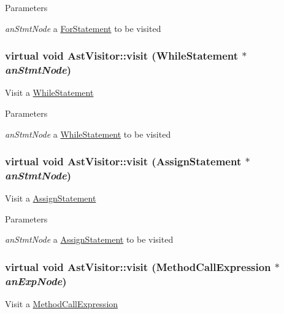 \begin{DoxyParams}{Parameters}
\item[{\em anStmtNode}]a \hyperlink{classForStatement}{ForStatement} to be visited \end{DoxyParams}
\hypertarget{classAstVisitor_ac1272bbe5b7c9b604cfd112001cbafa8}{
\subsubsection[{visit}]{\setlength{\rightskip}{0pt plus 5cm}virtual void AstVisitor::visit ({\bf WhileStatement} $\ast$ {\em anStmtNode})}}
\label{classAstVisitor_ac1272bbe5b7c9b604cfd112001cbafa8}
Visit a \hyperlink{classWhileStatement}{WhileStatement}


\begin{DoxyParams}{Parameters}
\item[{\em anStmtNode}]a \hyperlink{classWhileStatement}{WhileStatement} to be visited \end{DoxyParams}
\hypertarget{classAstVisitor_a44bb2ee3b317cd859760b2a747a26dfd}{
\subsubsection[{visit}]{\setlength{\rightskip}{0pt plus 5cm}virtual void AstVisitor::visit ({\bf AssignStatement} $\ast$ {\em anStmtNode})}}
\label{classAstVisitor_a44bb2ee3b317cd859760b2a747a26dfd}
Visit a \hyperlink{classAssignStatement}{AssignStatement}


\begin{DoxyParams}{Parameters}
\item[{\em anStmtNode}]a \hyperlink{classAssignStatement}{AssignStatement} to be visited \end{DoxyParams}
\hypertarget{classAstVisitor_af1b565438e63e492a6696a7ee0872815}{
\subsubsection[{visit}]{\setlength{\rightskip}{0pt plus 5cm}virtual void AstVisitor::visit ({\bf MethodCallExpression} $\ast$ {\em anExpNode})}}
\label{classAstVisitor_af1b565438e63e492a6696a7ee0872815}
Visit a \hyperlink{classMethodCallExpression}{MethodCallExpression}


